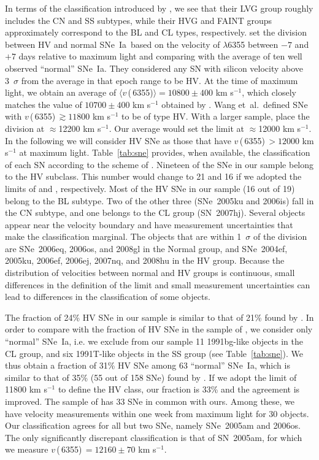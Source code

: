 \documentclass[apj]{emulateapj-rtx4}
\newcommand{\vsix}{$v$\,(\ion{Si}{2}\,6355)}
\newcommand{\sneia}{SNe~Ia}
\begin{document}
In terms of the classification introduced by \citet{benetti05}
\citep[see also][]{hachinger06}, we see
that their LVG group roughly includes the CN and SS subtypes,
while their HVG and FAINT groups approximately correspond to the BL
and CL types, respectively. \citet{wang09} set the division between HV
and normal 
\sneia\ based on the velocity of  $\lambda$6355 between $-7$ and
$+7$ days relative to maximum light and comparing with the average of
ten well observed ``normal'' \sneia. They considered any SN with
silicon velocity above 
3~$\sigma$ from the average in that epoch range to be HV. At the time of
maximum light, we obtain an average of $\langle$\vsix$\rangle=10800
\pm 400$ km s$^{-1}$, which closely matches the value of $10700 \pm
400$ km s$^{-1}$ obtained by \citet{wang09}. Wang et~al.~defined
SNe with \vsix\,$\gtrsim 11800$ km s$^{-1}$
to be of type HV. With a larger sample, \citet{blondin12} place the
division at $\approx$12200 km s$^{-1}$. Our average would set the
limit at $\approx$12000 km s$^{-1}$. In the following we will consider
HV SNe as those that have \vsix\,$>12000$ km s$^{-1}$ at maximum
light. Table~\ref{tab:sne} provides, when
available, the classification of each SN according to the scheme of
\citet{wang09}. Nineteen of the SNe in our sample belong to the HV
subclass. This number would change to 21 and 16 if
we adopted the limits of \citet{wang09} and \citet{blondin12},
respectively. Most of the HV SNe in our sample (16 out
of 19) belong to the BL subtype. Two of the other three (SNe~2005ku
and 2006is) fall in the CN subtype, and one belongs to the CL group
(SN~2007hj). Several objects appear near the velocity boundary and
have measurement uncertainties that make the classification
marginal. The objects that are within 1~$\sigma$ of the division are
SNe~2006eq, 2006os, and 2008gl in the Normal group, and SNe~2004ef,
2005ku, 2006ef, 2006ej, 2007nq, and 2008hu in the HV group.
Because the distribution of velocities between
normal and HV groups is continuous, small differences in the
definition of the limit and small measurement uncertainties can lead to
differences in the classification of some objects.

The fraction of 24\% HV SNe in our sample is 
similar to that of 21\% found by \citet{blondin12}. In order to
compare with the fraction of HV SNe in the sample of \citet{wang09},
we consider only ``normal'' \sneia, i.e. we exclude from our sample 11
1991bg-like objects in the CL group, and six 1991T-like objects
in the SS group (see Table~\ref{tab:sne}). We thus obtain a fraction
of 31\% HV SNe among 63 ``normal'' \sneia, which
is similar to that of 35\% (55 out of 158 SNe) found by
\citet{wang09}. If we adopt the limit of 11800 km s$^{-1}$ to define
the HV class, our fraction is 33\% and the agreement is
improved. The sample of \citet{wang09} has 33 SNe in common with
ours. Among these, we have velocity measurements within one week from
maximum light for 30 objects. Our classification agrees
for all but two SNe, namely SNe~2005am and 2006os. The only
significantly discrepant classification is that of
SN~2005am, for which we measure \vsix\,$=12160\pm70$ km s$^{-1}$.
\end{document}
